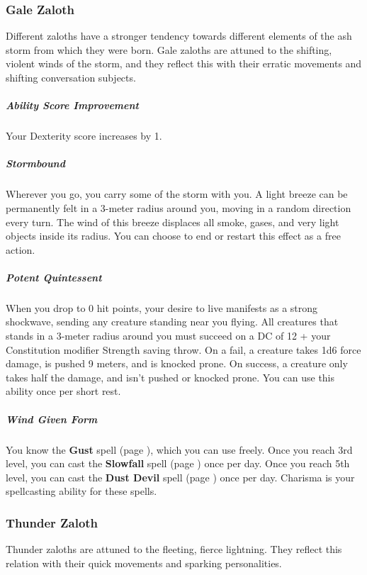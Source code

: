 \subsubsection{Gale Zaloth}
    Different zaloths have a stronger tendency towards different elements of the ash storm from which they were born.
    Gale zaloths are attuned to the shifting, violent winds of the storm, and they reflect this with their erratic movements and shifting conversation subjects.

    \subparagraph{Ability Score Improvement}
        Your Dexterity score increases by 1.

    \subparagraph{Stormbound}
        Wherever you go, you carry some of the storm with you.
        A light breeze can be permanently felt in a 3-meter radius around you, moving in a random direction every turn.
        The wind of this breeze displaces all smoke, gases, and very light objects inside its radius.
        You can choose to end or restart this effect as a free action.

    \subparagraph{Potent Quintessent}
        When you drop to 0 hit points, your desire to live manifests as a strong shockwave, sending any creature standing near you flying.
        All creatures that stands in a 3-meter radius around you must succeed on a DC of 12 + your Constitution modifier Strength saving throw.
        On a fail, a creature takes 1d6 force damage, is pushed 9 meters, and is knocked prone.
        On success, a creature only takes half the damage, and isn't pushed or knocked prone.
        You can use this ability once per short rest.

    \subparagraph{Wind Given Form}
        You know the \textbf{Gust} spell (page \pageref{spell::gust}), which you can use freely.
        Once you reach 3rd level, you can cast the \textbf{Slowfall} spell (page \pageref{spell::slowfall}) once per day.
        Once you reach 5th level, you can cast the \textbf{Dust Devil} spell (page \pageref{spell::dustdevil}) once per day.
        Charisma is your spellcasting ability for these spells.

\subsubsection{Thunder Zaloth}
    Thunder zaloths are attuned to the fleeting, fierce lightning.
    They reflect this relation with their quick movements and sparking personalities.


